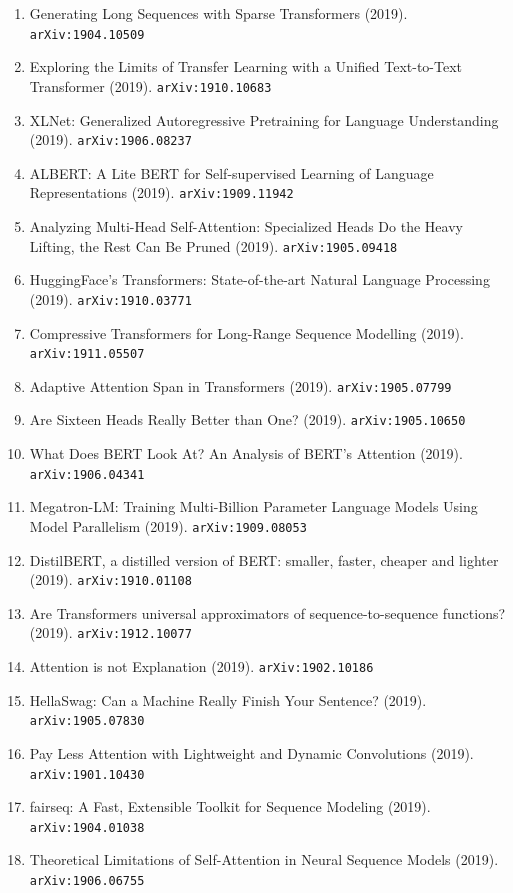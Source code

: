 \documentclass[11pt]{article}
\begin{document}
\begin{enumerate}
  \item Generating Long Sequences with Sparse Transformers (2019). \texttt{arXiv:1904.10509}
  \item Exploring the Limits of Transfer Learning with a Unified Text-to-Text
  Transformer (2019). \texttt{arXiv:1910.10683}
  \item XLNet: Generalized Autoregressive Pretraining for Language Understanding (2019). \texttt{arXiv:1906.08237}
  \item ALBERT: A Lite BERT for Self-supervised Learning of Language
  Representations (2019). \texttt{arXiv:1909.11942}
  \item Analyzing Multi-Head Self-Attention: Specialized Heads Do the Heavy
  Lifting, the Rest Can Be Pruned (2019). \texttt{arXiv:1905.09418}
  \item HuggingFace's Transformers: State-of-the-art Natural Language Processing (2019). \texttt{arXiv:1910.03771}
  \item Compressive Transformers for Long-Range Sequence Modelling (2019). \texttt{arXiv:1911.05507}
  \item Adaptive Attention Span in Transformers (2019). \texttt{arXiv:1905.07799}
  \item Are Sixteen Heads Really Better than One? (2019). \texttt{arXiv:1905.10650}
  \item What Does BERT Look At? An Analysis of BERT's Attention (2019). \texttt{arXiv:1906.04341}
  \item Megatron-LM: Training Multi-Billion Parameter Language Models Using
  Model Parallelism (2019). \texttt{arXiv:1909.08053}
  \item DistilBERT, a distilled version of BERT: smaller, faster, cheaper and
  lighter (2019). \texttt{arXiv:1910.01108}
  \item Are Transformers universal approximators of sequence-to-sequence
  functions? (2019). \texttt{arXiv:1912.10077}
  \item Attention is not Explanation (2019). \texttt{arXiv:1902.10186}
  \item HellaSwag: Can a Machine Really Finish Your Sentence? (2019). \texttt{arXiv:1905.07830}
  \item Pay Less Attention with Lightweight and Dynamic Convolutions (2019). \texttt{arXiv:1901.10430}
  \item fairseq: A Fast, Extensible Toolkit for Sequence Modeling (2019). \texttt{arXiv:1904.01038}
  \item Theoretical Limitations of Self-Attention in Neural Sequence Models (2019). \texttt{arXiv:1906.06755}

\end{enumerate}
\end{document}
